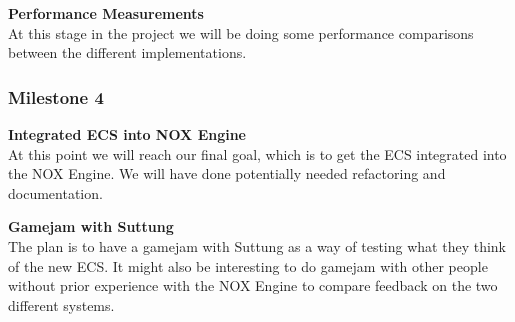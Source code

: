 \noindent\textbf{Performance Measurements}\\
At this stage in the project we will be doing some performance comparisons between
the different implementations.

\subsubsection{Milestone 4}
\noindent\textbf{Integrated ECS into NOX Engine}\\
At this point we will reach our final goal, which is to get the ECS integrated into the NOX Engine.
We will have done potentially needed refactoring and documentation.

\noindent\textbf{Gamejam with Suttung}\\
The plan is to have a gamejam with Suttung as a way of testing what they think of the new ECS.
It might also be interesting to do gamejam with other people without prior experience with the NOX Engine
to compare feedback on the two different systems.
